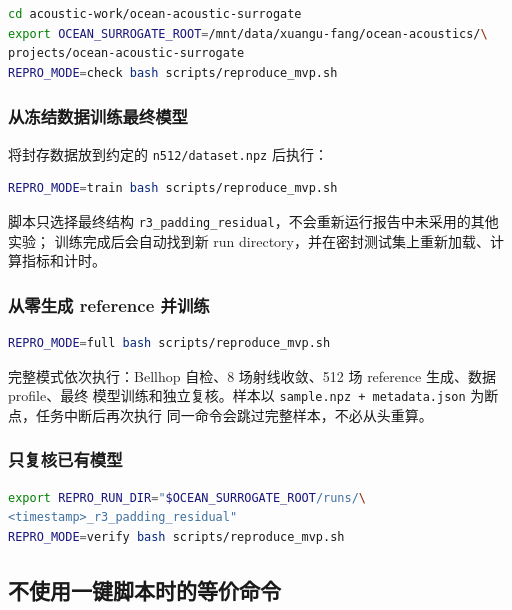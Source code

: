 \documentclass[UTF8,11pt]{ctexart}
\begin{document}
\begin{lstlisting}[style=repro,language=bash]
cd acoustic-work/ocean-acoustic-surrogate
export OCEAN_SURROGATE_ROOT=/mnt/data/xuangu-fang/ocean-acoustics/\
projects/ocean-acoustic-surrogate
REPRO_MODE=check bash scripts/reproduce_mvp.sh
\end{lstlisting}

\subsubsection{从冻结数据训练最终模型}

将封存数据放到约定的 \texttt{n512/dataset.npz} 后执行：

\begin{lstlisting}[style=repro,language=bash]
REPRO_MODE=train bash scripts/reproduce_mvp.sh
\end{lstlisting}

脚本只选择最终结构 \texttt{r3\_padding\_residual}，不会重新运行报告中未采用的其他实验；
训练完成后会自动找到新 run directory，并在密封测试集上重新加载、计算指标和计时。

\subsubsection{从零生成 reference 并训练}

\begin{lstlisting}[style=repro,language=bash]
REPRO_MODE=full bash scripts/reproduce_mvp.sh
\end{lstlisting}

完整模式依次执行：Bellhop 自检、8 场射线收敛、512 场 reference 生成、数据 profile、最终
模型训练和独立复核。样本以 \texttt{sample.npz + metadata.json} 为断点，任务中断后再次执行
同一命令会跳过完整样本，不必从头重算。

\subsubsection{只复核已有模型}

\begin{lstlisting}[style=repro,language=bash]
export REPRO_RUN_DIR="$OCEAN_SURROGATE_ROOT/runs/\
<timestamp>_r3_padding_residual"
REPRO_MODE=verify bash scripts/reproduce_mvp.sh
\end{lstlisting}

\subsection{不使用一键脚本时的等价命令}
\end{document}
